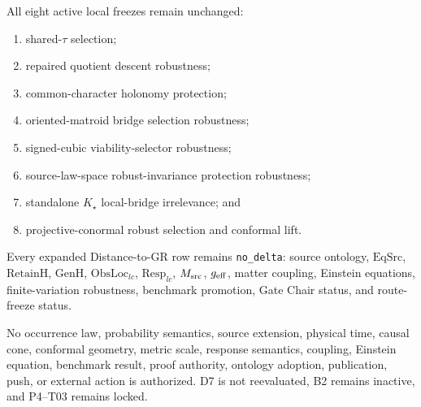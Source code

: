 \documentclass[11pt]{article}
\begin{document}
All eight active local freezes remain unchanged:
\begin{enumerate}[leftmargin=2em]
\item shared-$\tau$ selection;
\item repaired quotient descent robustness;
\item common-character holonomy protection;
\item oriented-matroid bridge selection robustness;
\item signed-cubic viability-selector robustness;
\item source-law-space robust-invariance protection robustness;
\item standalone $K_\star$ local-bridge irrelevance; and
\item projective-conormal robust selection and conformal lift.
\end{enumerate}

Every expanded Distance-to-GR row remains \texttt{no\_delta}: source
ontology, $\mathrm{EqSrc}$, $\mathrm{RetainH}$, $\mathrm{GenH}$,
$\mathrm{ObsLoc}_{lc}$, $\mathrm{Resp}_{lc}$, $M_{\rm src}$,
$g_{\rm eff}$, matter coupling, Einstein equations, finite-variation
robustness, benchmark promotion, Gate Chair status, and route-freeze status.

No occurrence law, probability semantics, source extension, physical time,
causal cone, conformal geometry, metric scale, response semantics, coupling,
Einstein equation, benchmark result, proof authority, ontology adoption,
publication, push, or external action is authorized.  D7 is not reevaluated,
B2 remains inactive, and P4--T03 remains locked.
\end{document}
